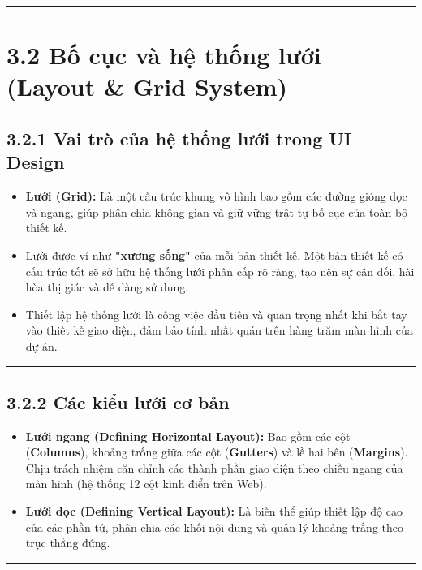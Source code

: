 \documentclass[11pt,a4paper,oneside]{report}
\begin{document}
\bigskip\hrule\bigskip

\section{3.2 Bố cục và hệ thống lưới (Layout \& Grid System)}

\subsection{3.2.1 Vai trò của hệ thống lưới trong UI Design}
\begin{itemize}[leftmargin=1.5em]
\item \textbf{Lưới (Grid):} Là một cấu trúc khung vô hình bao gồm các đường gióng dọc và ngang, giúp phân chia không gian và giữ vững trật tự bố cục của toàn bộ thiết kế.
\item Lưới được ví như \textbf{"xương sống"} của mỗi bản thiết kế. Một bản thiết kế có cấu trúc tốt sẽ sở hữu hệ thống lưới phân cấp rõ ràng, tạo nên sự cân đối, hài hòa thị giác và dễ dàng sử dụng.
\item Thiết lập hệ thống lưới là công việc đầu tiên và quan trọng nhất khi bắt tay vào thiết kế giao diện, đảm bảo tính nhất quán trên hàng trăm màn hình của dự án.
\end{itemize}

\bigskip\hrule\bigskip

\subsection{3.2.2 Các kiểu lưới cơ bản}
\begin{itemize}[leftmargin=1.5em]
\item \textbf{Lưới ngang (Defining Horizontal Layout):} Bao gồm các cột (\textbf{Columns}), khoảng trống giữa các cột (\textbf{Gutters}) và lề hai bên (\textbf{Margins}). Chịu trách nhiệm căn chỉnh các thành phần giao diện theo chiều ngang của màn hình (hệ thống 12 cột kinh điển trên Web).
\item \textbf{Lưới dọc (Defining Vertical Layout):} Là biến thể giúp thiết lập độ cao của các phần tử, phân chia các khối nội dung và quản lý khoảng trắng theo trục thẳng đứng.
\end{itemize}

\bigskip\hrule\bigskip
\end{document}
